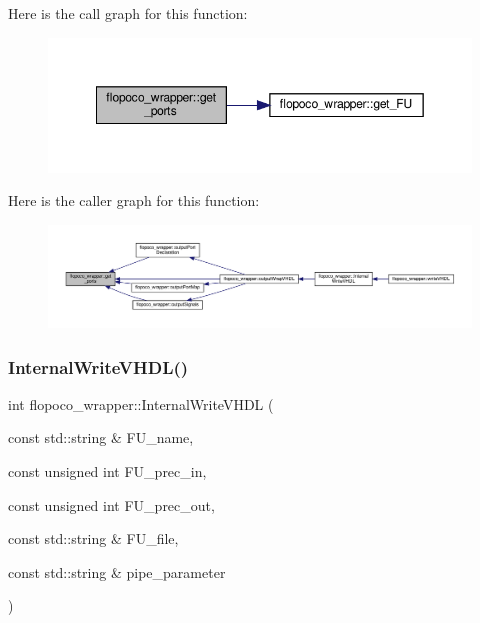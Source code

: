 Here is the call graph for this function\+:
\nopagebreak
\begin{figure}[H]
\begin{center}
\leavevmode
\includegraphics[width=349pt]{d7/dbf/classflopoco__wrapper_ae65f581fe20c9fa4595857e5f296c619_cgraph}
\end{center}
\end{figure}
Here is the caller graph for this function\+:
\nopagebreak
\begin{figure}[H]
\begin{center}
\leavevmode
\includegraphics[width=350pt]{d7/dbf/classflopoco__wrapper_ae65f581fe20c9fa4595857e5f296c619_icgraph}
\end{center}
\end{figure}
\mbox{\label{classflopoco__wrapper_afc229ae93b5772fadc22ead428f29036}} 
\subsubsection{\texorpdfstring{Internal\+Write\+V\+H\+D\+L()}{InternalWriteVHDL()}}
{\footnotesize\ttfamily int flopoco\+\_\+wrapper\+::\+Internal\+Write\+V\+H\+DL (\begin{DoxyParamCaption}\item[{const std\+::string \&}]{F\+U\+\_\+name,  }\item[{const unsigned int}]{F\+U\+\_\+prec\+\_\+in,  }\item[{const unsigned int}]{F\+U\+\_\+prec\+\_\+out,  }\item[{const std\+::string \&}]{F\+U\+\_\+file,  }\item[{const std\+::string \&}]{pipe\+\_\+parameter }\end{DoxyParamCaption})\hspace{0.3cm}{\ttfamily [private]}}



